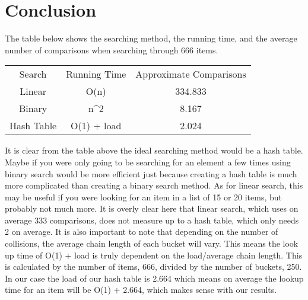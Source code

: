 \documentclass{article}
\begin{document}
\section{Conclusion}
The table below shows the searching method, the running time, and the average number of comparisons when searching through 666 items. 
\begin{center}
\begin{tabular}{ c c c }
 Search & Running Time & Approximate Comparisons \\ 
 Linear & O(n) &   334.833 \\ 
 Binary & n^2 & 8.167 \\  
 Hash Table & O(1) + load & 2.024 \\
\end{tabular}
\end{center}
It is clear from the table above the ideal searching method would be a hash table. Maybe if you were only going to be searching for an element a few times using binary search would be more efficient just because creating a hash table is much more complicated than creating a binary search method. As for linear search, this may be useful if you were looking for an item in a list of 15 or 20 items, but probably not much more. It is overly clear here that linear search, which uses on average 333 comparisons, does not measure up to a hash table, which only needs 2 on average. It is also important to note that depending on the number of collisions, the average chain length of each bucket will vary. This means the look up time of O(1) + load is truly dependent on the load/average chain length. This is calculated by the number of items, 666, divided by the number of buckets, 250. In our case the load of our hash table is 2.664 which means on average the lookup time for an item will be O(1) + 2.664, which makes sense with our results. 
\end{document}
